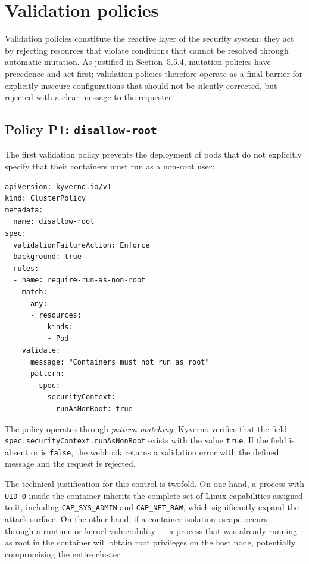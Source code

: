 \section{Validation policies}

Validation policies constitute the reactive layer of the security system: they act by rejecting resources that violate conditions that cannot be resolved through automatic mutation. As justified in Section~5.5.4, mutation policies have precedence and act first; validation policies therefore operate as a final barrier for explicitly insecure configurations that should not be silently corrected, but rejected with a clear message to the requester.

\subsection{Policy P1: \texttt{disallow-root}}

The first validation policy prevents the deployment of pods that do not explicitly specify that their containers must run as a non-root user:

\begin{lstlisting}
apiVersion: kyverno.io/v1
kind: ClusterPolicy
metadata:
  name: disallow-root
spec:
  validationFailureAction: Enforce
  background: true
  rules:
  - name: require-run-as-non-root
    match:
      any:
      - resources:
          kinds:
          - Pod
    validate:
      message: "Containers must not run as root"
      pattern:
        spec:
          securityContext:
            runAsNonRoot: true
\end{lstlisting}

The policy operates through \textit{pattern matching}: Kyverno verifies that the field \texttt{spec.security\allowbreak{}Context.\allowbreak{}runAsNonRoot} exists with the value \texttt{true}. If the field is absent or is \texttt{false}, the webhook returns a validation error with the defined message and the request is rejected.

The technical justification for this control is twofold. On one hand, a process with \texttt{UID~0} inside the container inherits the complete set of Linux capabilities assigned to it, including \texttt{CAP\_SYS\_ADMIN} and \texttt{CAP\_NET\_RAW}, which significantly expand the attack surface. On the other hand, if a container isolation escape occurs --- through a runtime or kernel vulnerability --- a process that was already running as root in the container will obtain root privileges on the host node, potentially compromising the entire cluster.

